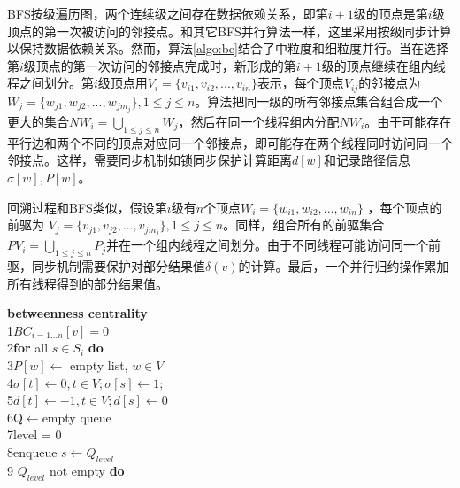 \begin{flushleft}
BFS按级遍历图，两个连续级之间存在数据依赖关系，即第$i+1$级的顶点是第$i$级顶点的第一次被访问的邻接点。和其它BFS并行算法一样，这里采用按级同步计算以保持数据依赖关系。然而，算法\ref{algo:bc}结合了中粒度和细粒度并行。当在选择第$i$级顶点的第一次访问的邻接点完成时，新形成的第$i+1$级的顶点继续在组内线程之间划分。第$i$级顶点用$V_{i} = \{v_{i1}, v_{i2}, ..., v_{in}\}$表示，每个顶点$V_{ij}$的邻接点为 $W_{j} = \{w_{j1}, w_{j2}, ..., w_{jm_{j}}\},1 \le j \le n$。算法把同一级的所有邻接点集合组合成一个更大的集合$NW_{i} = \bigcup_{1\le j\le n}W_{j}$，然后在同一个线程组内分配$NW_{i}$。由于可能存在平行边和两个不同的顶点对应同一个邻接点，即可能存在两个线程同时访问同一个邻接点。这样，需要同步机制如锁同步保护计算距离$d[w]$和记录路径信息$\sigma[w],P[w]$。

回溯过程和BFS类似，假设第$i$级有$n$个顶点$W_{i} = \{w_{i1}, w_{i2}, ..., w_{in}\}$ ，每个顶点的前驱为 $V_{j} = \{v_{j1}, v_{j2}, ..., v_{jm_{j}}\},1 \le j \le n$。同样，组合所有的前驱集合$PV_{i} = \bigcup_{1\le j\le n}P_{j}$并在一个组内线程之间划分。由于不同线程可能访问同一个前驱，同步机制需要保护对部分结果值$\delta(v)$的计算。最后，一个并行归约操作累加所有线程得到的部分结果值。
\begin{algorithm}\label{algo:bc}
	{\bf betweenness centrality}\\
	1\hspace*{1pc}$BC_{i=1...n}[v] = 0$ \\
	2{\bf for} all $s\in S_{i}$ {\bf do}\\
	3\hspace*{1pc}$P[w]\leftarrow$ empty list, $w\in V$\\
	4\hspace*{1pc}$\sigma[t]\leftarrow 0, t\in V;\sigma[s]\leftarrow 1;$\\
	5\hspace*{1pc}$d[t]\leftarrow -1,t\in V;d[s]\leftarrow 0$\\
	6\hspace*{1pc}Q$\leftarrow$empty queue\\
	7\hspace*{1pc}level = 0\\
	8\hspace*{1pc}enqueue $s\leftarrow Q_{level}$\\
	9\hspace*{1pc}{\bf while} $Q_{level}$ not empty {\bf do}\\

\end{algorithm}
\end{flushleft}
